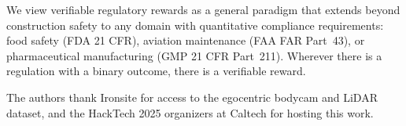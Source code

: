 \documentclass[sigconf,nonacm]{acmart}
\begin{document}
We view verifiable regulatory rewards as a general paradigm that extends
beyond construction safety to any domain with quantitative compliance
requirements: food safety (FDA 21 CFR), aviation maintenance (FAA
FAR Part~43), or pharmaceutical manufacturing (GMP 21 CFR Part~211).
Wherever there is a regulation with a binary outcome, there is a
verifiable reward.

\begin{acks}
The authors thank Ironsite for access to the egocentric bodycam and
LiDAR dataset, and the HackTech 2025 organizers at Caltech for hosting
this work.
\end{acks}



\end{document}
